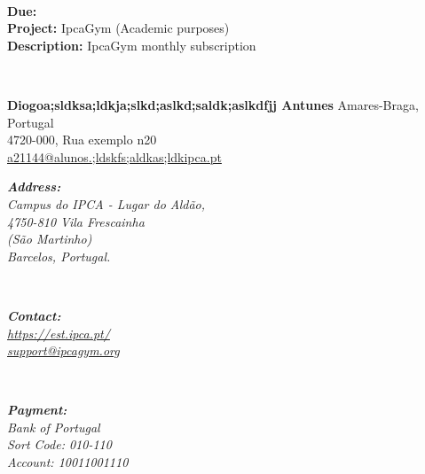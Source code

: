 \documentclass[
        a4paper,
        9pt,
]{/home/db/dev/repo_g06/Invoice/invoice}
\begin{document}
\outputinvoicenum \\
\begin{minipage}[t]{0.38\textwidth}
        \textbf{Due:} \\
    \textbf{Project:} IpcaGym (Academic purposes)\\
        \textbf{Description:} IpcaGym monthly subscription\\
\end{minipage}
\begin{minipage}[t]{0.03\textwidth}
        ~
\end{minipage}
\begin{minipage}[t]{0.56\textwidth}
	\textbf{Diogoa;sldksa;ldkja;slkd;aslkd;saldk;aslkdfjj Antunes}
    Amares-Braga, Portugal\\
4720-000, Rua exemplo n20 \\
	\href{a21144@alunos.;ldskfs;aldkas;ldkipca.pt}{a21144@alunos.;ldskfs;aldkas;ldkipca.pt}
\end{minipage}
\vfill
\begin{invoicetable}
\end{invoicetable}
\vfill\vfill
{}
\begin{minipage}[t]{0.3\textwidth}
        \itshape
        \textbf{Address:}\\
    Campus do IPCA - Lugar do Aldão,\\
    4750-810 Vila Frescainha\\
    (São Martinho)\\
    Barcelos, Portugal.
\end{minipage}
\begin{minipage}[t]{0.03\textwidth}
        ~
\end{minipage}
\begin{minipage}[t]{0.3\textwidth}
        \itshape
        \textbf{Contact:}\\
        \href{https://est.ipca.pt/}{https://est.ipca.pt/}\\
    \href{support@ipcagym.org}{support@ipcagym.org} \\
\end{minipage}
\begin{minipage}[t]{0.03\textwidth}
        ~
\end{minipage}
\begin{minipage}[t]{0.3\textwidth}
        \itshape
        \textbf{Payment:}\\
        Bank of Portugal \\
        Sort Code: 010-110 \\
        Account: 10011001110 \\
\end{minipage}
\end{document}
